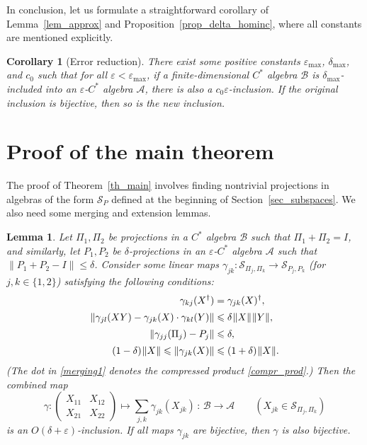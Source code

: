 \documentclass[12pt]{article}
\newcommand{\calA}{\mathcal{A}}
\newcommand{\calB}{\mathcal{B}}
\newcommand{\calS}{\mathcal{S}}
\newcommand{\ts}{\mkern1mu}
\newcommand{\eps}{\varepsilon}
\renewcommand{\le}{\leqslant}
\newtheorem{Lemma}[Theorem]{Lemma}
\newtheorem{Corollary}[Theorem]{Corollary}
\newtheorem[definition]{Definition}[Theorem]{Definition}
\newtheorem[remark]{Example}[Theorem]{Example}
\newtheorem[remark]{Remark}[Theorem]{Remark}
\newtheorem[remark]{Question}[Theorem]{Open question}
\newtheorem*[definition]{definition}{Definition}
\newtheorem*[remark]{example}{Example}
\newtheorem*[remark]{remark}{Remark}
\newtheorem*[remark]{question}{Open question}
\numberwithin{equation}{section}
\begin{document}
In conclusion, let us formulate a straightforward corollary of Lemma~\ref{lem_approx} and Proposition~\ref{prop_delta_hominc}, where all constants are mentioned explicitly.
\begin{Corollary}[Error reduction]\label{cor_improvement}
There exist some positive constants $\eps_{\max}$, $\delta_{\max}$, and $c_0$ such that for all $\eps<\eps_{\max}$, if a finite-dimensional $C^*$ algebra $\calB$ is $\delta_{\max}$-included into an $\eps$-$C^*$ algebra $\calA$, there is also a $c_0\eps$-inclusion. If the original inclusion is bijective, then so is the new inclusion.
\end{Corollary}

\section{Proof of the main theorem}\label{sec_proof_main}

The proof of Theorem~\ref{th_main} involves finding nontrivial projections in algebras of the form $\calS_{P}$ defined at the beginning of Section~\ref{sec_subspaces}. We also need some merging and extension lemmas.

\begin{Lemma}\label{lem_merging}
Let $\Pi_1,\Pi_2$ be projections in a $C^*$ algebra $\calB$ such that $\Pi_1+\Pi_2=I$, and similarly, let $P_1,P_2$ be $\delta$-projections in an $\eps$-$C^*$ algebra $\calA$ such that $\|P_1+P_2-I\|\le\delta$. Consider some linear maps $\gamma_{jk}\colon\calS_{\Pi_j,\Pi_k}\to\calS_{P_j,P_k}$ (for $j,k\in\{1,2\}$) satisfying the following conditions:
\begin{align}
\label{merging0}
\gamma_{kj}(X^\dag)&=\gamma_{jk}(X)^\dag,\\[2pt]
\label{merging1}
\|\gamma_{jl}(XY)-\gamma_{jk}(X)\cdot\gamma_{kl}(Y)\|
&\le\delta\ts\|X\|\ts\|Y\|,\\[2pt]
\label{merging2}
\|\gamma_{jj}(\Pi_j)-P_j\|&\le\delta,\\[2pt]
\label{merging3}
(1-\delta)\ts\|X\|\le\|\gamma_{jk}(X)\| &\le(1+\delta)\ts\|X\|.
\end{align}
(The dot in \eqref{merging1} denotes the compressed product \eqref{compr_prod}.) Then the combined map
\begin{equation}
\gamma\colon
\begin{pmatrix}X_{11} & X_{12}\\ X_{21} & X_{22}\end{pmatrix}
\mapsto\sum_{j,k}\gamma_{jk}(X_{jk})\,\colon\,\calB\to\calA\qquad
(X_{jk}\in\calS_{\Pi_j,\Pi_k})
\end{equation}
is an $O(\delta+\eps)$-inclusion. If all maps $\gamma_{jk}$ are bijective, then $\gamma$ is also bijective.
\end{Lemma}
\end{document}
